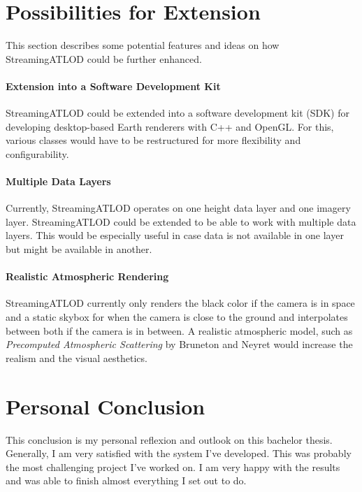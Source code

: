 \section{Possibilities for Extension}
This section describes some potential 
features and ideas on how StreamingATLOD could be further enhanced.

\paragraph{Extension into a Software Development Kit}
StreamingATLOD could be extended into a software development kit (SDK)
for developing desktop-based Earth renderers with C++ and OpenGL.
For this, various classes would have to be restructured 
for more flexibility and configurability.

\paragraph{Multiple Data Layers}
Currently, StreamingATLOD operates on one height data layer 
and one imagery layer. StreamingATLOD could be extended 
to be able to work with multiple data layers. This would be 
especially useful in case data is not available in one layer 
but might be available in another.

\paragraph{Realistic Atmospheric Rendering}
StreamingATLOD currently only renders the black color if the camera 
is in space and a static skybox for when the camera is close 
to the ground and interpolates between both if the camera 
is in between. A realistic atmospheric model, such as 
\textit{Precomputed Atmospheric Scattering} by Bruneton and Neyret \cite{precomputedatmosphericscattering}
would increase the realism and the visual aesthetics.

\section{Personal Conclusion}
This conclusion is my personal reflexion and
outlook on this bachelor thesis. Generally, I am very 
satisfied with the system I've developed. This was probably the most 
challenging project I've worked on. 
I am very happy with the results
and was able to finish almost everything I set out to do.